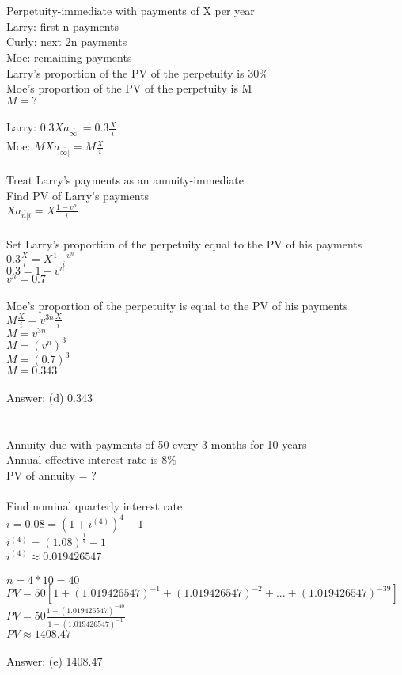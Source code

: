 \documentclass[12pt]{article}
\begin{document}
\section{}
Perpetuity-immediate with payments of X per year\\
Larry: first n payments\\
Curly: next 2n payments\\
Moe: remaining payments\\
Larry's proportion of the PV of the perpetuity is 30\%\\
Moe's proportion of the PV of the perpetuity is M\\
$M=?$\\
\\
Larry: $0.3Xa_{\overline{\infty|}}=0.3\frac{X}{i}$\\
Moe: $MXa_{\overline{\infty|}}=M\frac{X}{i}$\\
\\
Treat Larry's payments as an annuity-immediate\\
Find PV of Larry's payments\\
$Xa_{\overline{n|}i}=X\frac{1-v^{n}}{i}$\\
\\
Set Larry's proportion of the perpetuity equal to the PV of his payments\\
$0.3\frac{X}{i}=X\frac{1-v^{n}}{i}$\\
$0.3=1-v^{n}$\\
$v^{n}=0.7$\\
\\
Moe's proportion of the perpetuity is equal to the PV of his payments\\
$M\frac{X}{i}=v^{3n}\frac{X}{i}$\\
$M=v^{3n}$\\
$M=(v^{n})^{3}$\\
$M=(0.7)^{3}$\\
$M=0.343$\\
\\
Answer: (d) 0.343

\section{}
Annuity-due with payments of 50 every 3 months for 10 years\\
Annual effective interest rate is $8\%$\\
PV of annuity = ?\\
\\
Find nominal quarterly interest rate\\
$i=0.08=(1+i^{(4)})^{4}-1$\\
$i^{(4)}=(1.08)^{\frac{1}{4}}-1$\\
$i^{(4)}\approx0.019426547$\\
\\
$n=4*10=40$\\
$PV=50[1+(1.019426547)^{-1}+(1.019426547)^{-2}+...+(1.019426547)^{-39}]$\\
$PV=50\frac{1-(1.019426547)^{-40}}{1-(1.019426547)^{-1}}$\\
$PV\approx1408.47$\\
\\
Answer: (e) 1408.47
\end{document}
